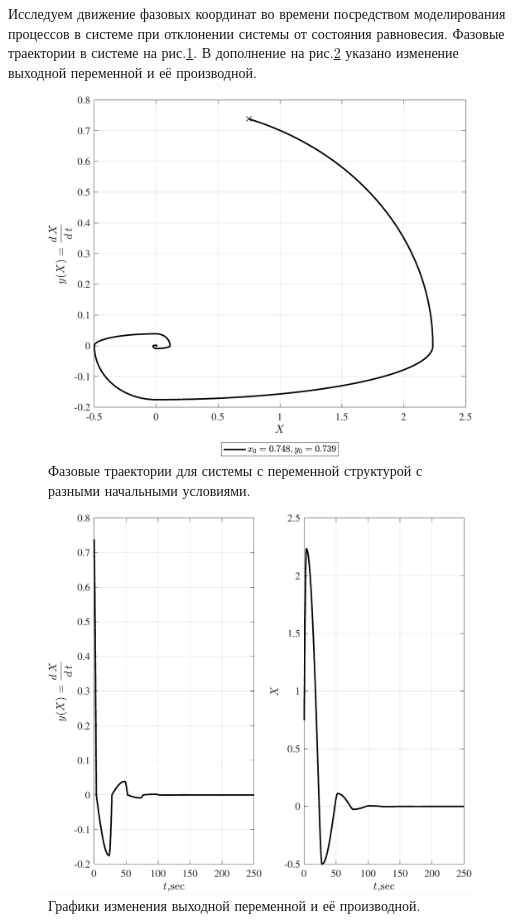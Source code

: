 Исследуем движение фазовых координат во времени посредством моделирования процессов в системе при отклонении системы от состояния равновесия. Фазовые траектории в системе на рис.\ref{fig:VSS_no_steady_degenerate_motion_ft_sedlo}. 
В дополнение на рис.\ref{fig:VSS_no_steady_degenerate_motion_sv_sedlo} указано изменение выходной переменной и её производной. 
\begin{figure}[!h]\centering
\includegraphics[width=1.0\linewidth]{images/VSS_no_steady_degenerate_motion_ft_sedlo}
\caption{ Фазовые траектории для системы с переменной структурой с разными начальными условиями.}\label{fig:VSS_no_steady_degenerate_motion_ft_sedlo}
\end{figure}
\begin{figure}[!h]\centering
\includegraphics[width=1.0\linewidth]{images/VSS_no_steady_degenerate_motion_sv_sedlo}
\caption{ Графики изменения выходной переменной и её производной.}\label{fig:VSS_no_steady_degenerate_motion_sv_sedlo}
\end{figure}
